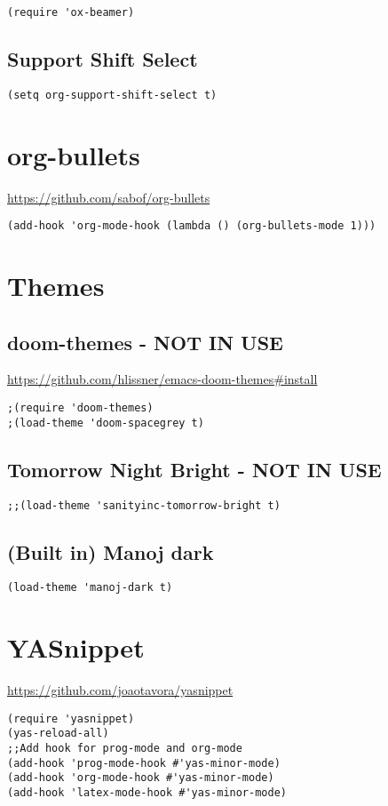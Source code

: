 \documentclass[11pt]{article}
\begin{document}
\begin{verbatim}
(require 'ox-beamer)
\end{verbatim}

\subsection{Support Shift Select}
\label{sec-3-2}

\begin{verbatim}
(setq org-support-shift-select t)
\end{verbatim}

\section{org-bullets}
\label{sec-4}
\url{https://github.com/sabof/org-bullets}
\begin{verbatim}
(add-hook 'org-mode-hook (lambda () (org-bullets-mode 1)))
\end{verbatim}
\section{Themes}
\label{sec-5}
\subsection{doom-themes - NOT IN USE}
\label{sec-5-1}
\url{https://github.com/hlissner/emacs-doom-themes#install}
\begin{verbatim}
;(require 'doom-themes)
;(load-theme 'doom-spacegrey t)
\end{verbatim}

\subsection{Tomorrow Night Bright - NOT IN USE}
\label{sec-5-2}
\begin{verbatim}
;;(load-theme 'sanityinc-tomorrow-bright t)
\end{verbatim}
\subsection{(Built in) Manoj dark}
\label{sec-5-3}
\begin{verbatim}
(load-theme 'manoj-dark t)
\end{verbatim}
\section{YASnippet}
\label{sec-6}
\url{https://github.com/joaotavora/yasnippet}
\begin{verbatim}
(require 'yasnippet)
(yas-reload-all)
;;Add hook for prog-mode and org-mode
(add-hook 'prog-mode-hook #'yas-minor-mode)
(add-hook 'org-mode-hook #'yas-minor-mode)
(add-hook 'latex-mode-hook #'yas-minor-mode)
\end{verbatim}
\end{document}
